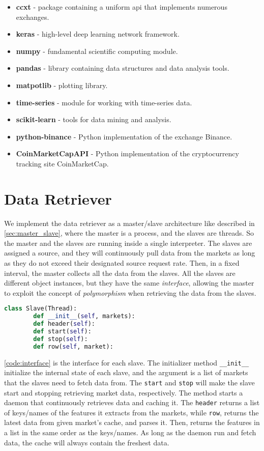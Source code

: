 \begin{itemize}
    \item \textbf{ccxt} - package containing a uniform \ac{api} that implements numerous exchanges.
    \item \textbf{keras} - high-level deep learning network framework.
    \item \textbf{numpy} - fundamental scientific computing module.
    \item \textbf{pandas} - library containing data structures and data analysis tools.
    \item \textbf{matpotlib} - plotting library.
    \item \textbf{time-series} - module for working with time-series data.  
    \item \textbf{scikit-learn} - tools for data mining and analysis.
    \item \textbf{python-binance} - Python implementation of the exchange Binance.
    \item \textbf{CoinMarketCapAPI} - Python implementation of the cryptocurrency tracking site CoinMarketCap.
\end{itemize}

\section{Data Retriever}
We implement the data retriever as a master/slave architecture like described in \autoref{sec:master_slave}, where the master is a process, and the slaves are threads. So the master and the slaves are running inside a single interpreter. The slaves are assigned a source, and they will continuously pull data from the markets as long as they do not exceed their designated source request rate. Then, in a fixed interval, the master collects all the data from the slaves. All the slaves are different object instances, but they have the same \emph{interface}, allowing the master to exploit the concept of \emph{polymorphism} when retrieving the data from the slaves.

\begin{lstlisting}[language=python, caption={Slave interface}, label=code:interface]
    class Slave(Thread):
        def __init__(self, markets):
        def header(self):
        def start(self):
        def stop(self):
        def row(self, market):
\end{lstlisting}

\autoref{code:interface} is the interface for each slave. The initializer method \texttt{\_\_init\_\_} initialize the internal state of each slave, and the argument is a list of markets that the slaves need to fetch data from. The \texttt{start} and \texttt{stop} will make the slave start and stopping retrieving market data, respectively. The  method starts a daemon that continuously retrieves data and caching it. The \texttt{header} returns a list of keys/names of the features it extracts from the markets, while \texttt{row}, returns the latest data from given market's cache, and parses it. Then, returns the features in a list in the same order as the keys/names. As long as the daemon run and fetch data, the cache will always contain the freshest data.

